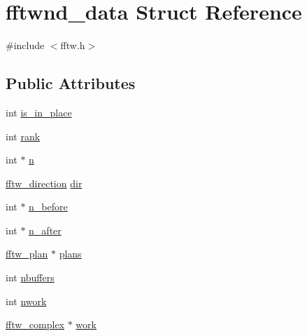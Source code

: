 \hypertarget{structfftwnd__data}{\section{fftwnd\-\_\-data Struct Reference}
\label{structfftwnd__data}
}


{\ttfamily \#include $<$fftw.\-h$>$}

\subsection*{Public Attributes}
\begin{DoxyCompactItemize}
\item 
int \hyperlink{structfftwnd__data_ad93f931868ab59241f4accb107a094a9}{is\-\_\-in\-\_\-place}
\item 
int \hyperlink{structfftwnd__data_a45c88cd0e574357ba13a671a94ce6adb}{rank}
\item 
int $\ast$ \hyperlink{structfftwnd__data_a3fa54e48b6012a8ad3075d261165e9ba}{n}
\item 
\hyperlink{fftw_8h_addfba51b1dc43e3660873b1ba9668cec}{fftw\-\_\-direction} \hyperlink{structfftwnd__data_af6539f7692dda806b475e2601063155f}{dir}
\item 
int $\ast$ \hyperlink{structfftwnd__data_aaee96deb92bd226d350c5a57d6cd8ac6}{n\-\_\-before}
\item 
int $\ast$ \hyperlink{structfftwnd__data_af2a9cac8bde7f13738a40e00a3536f6c}{n\-\_\-after}
\item 
\hyperlink{fftw_8h_a4bd55d67f7b6fd1a3951c3ec0b677b8c}{fftw\-\_\-plan} $\ast$ \hyperlink{structfftwnd__data_ae4f62c58612bb6ee7b6b2b056f7fc0a2}{plans}
\item 
int \hyperlink{structfftwnd__data_a5d44d57b6fea0744dee38c0fe668c256}{nbuffers}
\item 
int \hyperlink{structfftwnd__data_a032d7302d54a092ed1ca74f6392d52b1}{nwork}
\item 
\hyperlink{structfftw__complex}{fftw\-\_\-complex} $\ast$ \hyperlink{structfftwnd__data_a5d41dc9033beffa4d941c3dae155a862}{work}
\end{DoxyCompactItemize}


